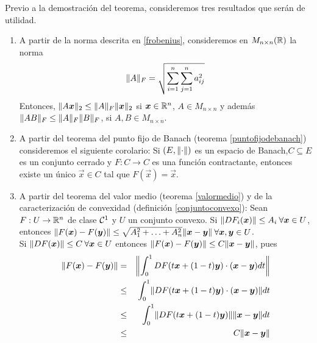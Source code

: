 Previo
a la demostraci\'on del teorema, consideremos tres resultados que
ser\'an de utilidad.
\begin{enumerate}
\item A partir de la norma descrita en \eqref{frobenius}, consideremos en $M_{n\times n}(\mathbb{R})$ la norma
$$\lVert A\rVert_F=\sqrt{\sum_{i=1}^n\sum_{j=1}^n a_{ij}^2}$$
Entonces, $\lVert A\boldsymbol{x}\rVert_2\leq \lVert A\rVert_F\lVert\boldsymbol{x}\rVert_2$ si $\boldsymbol{x}\in\mathbb{R}^n$, $A\in M_{n\times n}$ y adem\'as $\lVert AB\rVert_F\leq \lVert A\rVert_F\lVert B\rVert_F$, si $A,B\in M_{n\times n}$.
\item A partir del teorema del punto fijo de Banach (teorema \ref{puntofijodebanach}) consideremos el siguiente corolario: Si $(E,\lVert\cdot\rVert)$ es un espacio de Banach,$C\subseteq E$ es un conjunto cerrado y $F:C\to C$ es una funci\'on contractante, entonces existe un \'unico $\vec{x}\in C$ tal que $F(\vec{x})=\vec{x}$.
\item A partir del teorema del valor medio (teorema \ref{valormedio}) y de la caracterizaci\'on de convexidad (definici\'on \ref{conjuntoconvexo}): Sean $F:U\to \mathbb{R}^n$ de clase ${\cal{C}}^1$ y $U$ un conjunto convexo. Si $\lVert DF_i(\boldsymbol{x})\rVert\leq A_i\: \forall \boldsymbol{x}\in U$, entonces $\lVert F(\boldsymbol{x})-F(\boldsymbol{y})\rVert\leq \sqrt{A_1^2+\ldots+A_n^2}\lVert\boldsymbol{x}-\boldsymbol{y}\rVert\: \forall \boldsymbol{x},\boldsymbol{y}\in U$.\\
Si $\lVert DF(\boldsymbol{x})\rVert\leq C\:\forall \boldsymbol{x}\in
U$ entonces $\lVert F(\boldsymbol{x})-F(\boldsymbol{y})\rVert\leq C\lVert\boldsymbol{x}-\boldsymbol{y}\rVert$, pues
\begin{eqnarray*} \lVert F(\boldsymbol{x})-F(\boldsymbol{y})\rVert & = &
\left\|\int_0^1DF(t\boldsymbol{x}+(1-t)\boldsymbol{y}) \cdot (\boldsymbol{x}-\boldsymbol{y})dt \right\| \\
 & \leq & \int_0^1\lVert DF(t\boldsymbol{x}+(1-t)\boldsymbol{y})\cdot (\boldsymbol{x}-\boldsymbol{y})\rVert dt \\
 & \leq & \int_0^1\lVert DF(t\boldsymbol{x}+(1-t)\boldsymbol{y})\rVert\lVert\boldsymbol{x}-\boldsymbol{y}\rVert dt \\
 & \leq & C\lVert\boldsymbol{x}-\boldsymbol{y}\rVert
\end{eqnarray*}
\end{enumerate}

